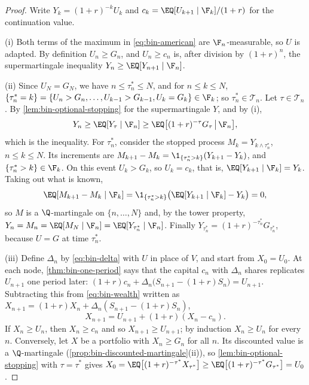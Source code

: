 \begin{proof}
Write $Y_k=(1+r)^{-k}U_k$ and $c_k=\EQ[U_{k+1}\mid\F_k]/(1+r)$ for the continuation value.

(i) Both terms of the maximum in \eqref{eq:bin-american} are $\F_n$-measurable, so $U$ is
adapted. By definition $U_n\ge G_n$, and $U_n\ge c_n$ is, after division by $(1+r)^n$,
the supermartingale inequality $Y_n\ge\EQ[Y_{n+1}\mid\F_n]$.

(ii) Since $U_N=G_N$, we have $n\le\tau^*_n\le N$, and for $n\le k\le N$,
$\{\tau^*_n=k\}=\{U_n>G_n,\dots,U_{k-1}>G_{k-1},U_k=G_k\}\in\F_k$; so
$\tau^*_n\in\mathcal T_n$. Let $\tau\in\mathcal T_n$. By \cref{lem:bin-optional-stopping}
for the supermartingale $Y$, and by (i),
\[
  Y_n\ge\EQ[Y_\tau\mid\F_n]\ge\EQ\big[(1+r)^{-\tau}G_\tau\,\big|\,\F_n\big],
\]
which is the inequality. For $\tau^*_n$, consider the stopped process
$M_k=Y_{k\wedge\tau^*_n}$, $n\le k\le N$. Its increments are
$M_{k+1}-M_k=\1_{\{\tau^*_n>k\}}(Y_{k+1}-Y_k)$, and $\{\tau^*_n>k\}\in\F_k$. On this event
$U_k>G_k$, so $U_k=c_k$, that is, $\EQ[Y_{k+1}\mid\F_k]=Y_k$. Taking out what is known,
\[
  \EQ[M_{k+1}-M_k\mid\F_k]=\1_{\{\tau^*_n>k\}}\big(\EQ[Y_{k+1}\mid\F_k]-Y_k\big)=0,
\]
so $M$ is a $\Q$-martingale on $\{n,\dots,N\}$ and, by the tower property,
$Y_n=M_n=\EQ[M_N\mid\F_n]=\EQ[Y_{\tau^*_n}\mid\F_n]$. Finally
$Y_{\tau^*_n}=(1+r)^{-\tau^*_n}G_{\tau^*_n}$, because $U=G$ at time $\tau^*_n$.

(iii) Define $\Delta_n$ by \eqref{eq:bin-delta} with $U$ in place of $V$, and start from
$X_0=U_0$. At each node, \cref{thm:bin-one-period} says that the capital $c_n$ with
$\Delta_n$ shares replicates $U_{n+1}$ one period later:
$(1+r)c_n+\Delta_n\big(S_{n+1}-(1+r)S_n\big)=U_{n+1}$. Subtracting this from
\eqref{eq:bin-wealth} written as $X_{n+1}=(1+r)X_n+\Delta_n(S_{n+1}-(1+r)S_n)$,
\[
  X_{n+1}=U_{n+1}+(1+r)(X_n-c_n).
\]
If $X_n\ge U_n$, then $X_n\ge c_n$ and so $X_{n+1}\ge U_{n+1}$; by induction $X_n\ge U_n$
for every $n$. Conversely, let $X$ be a portfolio with $X_n\ge G_n$ for all $n$. Its
discounted value is a $\Q$-martingale (\cref{prop:bin-discounted-martingale}(ii)), so
\cref{lem:bin-optional-stopping} with $\tau=\tau^*$ gives
$X_0=\EQ\big[(1+r)^{-\tau^*}X_{\tau^*}\big]\ge\EQ\big[(1+r)^{-\tau^*}G_{\tau^*}\big]=U_0$.


\end{proof}
